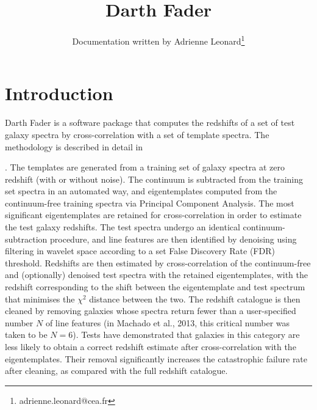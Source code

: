 \documentclass[a4paper]{article}
\begin{document}
\title{Darth Fader}
\author{Documentation written by Adrienne Leonard\footnote{adrienne.leonard@cea.fr}}
\maketitle

\section{Introduction}

Darth Fader is a software package that computes the redshifts of a set of test galaxy spectra by cross-correlation with a set of template spectra. The methodology is described in detail in 

. The templates are generated from a training set of galaxy spectra at zero redshift (with or without noise). The continuum is subtracted from the training set spectra in an automated way, and eigentemplates computed from the continuum-free training spectra via Principal Component Analysis. The most significant eigentemplates are retained for cross-correlation in order to estimate the test galaxy redshifts. The test spectra undergo an identical continuum-subtraction procedure, and line features are then identified by denoising using filtering in wavelet space according to a set False Discovery Rate (FDR) threshold. Redshifts are then estimated by cross-correlation of the continuum-free and (optionally) denoised test spectra with the retained eigentemplates, with the redshift corresponding to the shift between the eigentemplate and test spectrum that minimises the $\chi^2$ distance between the two. The redshift catalogue is then cleaned by removing galaxies whose spectra return fewer than a user-specified number $N$ of line features (in Machado et al., 2013, this critical number was taken to be $N=6$). Tests have demonstrated that galaxies in this category are less likely to obtain a correct redshift estimate after cross-correlation with the eigentemplates. Their removal significantly increases the catastrophic failure rate after cleaning, as compared with the full redshift catalogue. 
\end{document}
